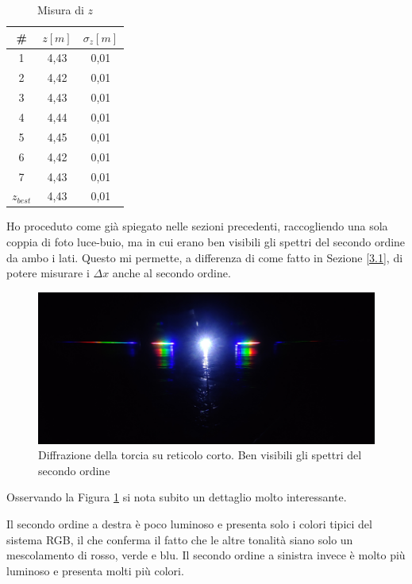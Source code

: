 \documentclass{article}
\begin{document}
\begin{table}[h]
    \centering
        \begin{tabular}{||c|c|c||}
            \hline
            \# & $z [m]$ & $\sigma_z [m]$\\
            \hline
            1 & 4,43 & 0,01 \\
            2 & 4,42 & 0,01 \\
            3 & 4,43 & 0,01 \\
            4 & 4,44 & 0,01 \\
            5 & 4,45 & 0,01 \\
            6 & 4,42 & 0,01 \\
            7 & 4,43 & 0,01 \\
            \hline
            $z_{best}$ & 4,43 & 0,01 \\
            \hline
        \end{tabular}
    \caption{Misura di $z$}
\end{table}


\vspace{3mm}

Ho proceduto come già spiegato nelle sezioni precedenti, raccogliendo una sola coppia di foto luce-buio, ma in cui erano ben visibili gli spettri del secondo ordine da ambo i lati. Questo mi permette, a differenza di come fatto in Sezione \ref{3.1}, di potere misurare i $\Delta x$ anche al secondo ordine.
\pagebreak
\begin{figure}[h]
    \centering
    \includegraphics[width=0.7\linewidth]{TorciaCorto5_OFF.jpg}
    \caption{Diffrazione della torcia su reticolo corto. Ben visibili gli spettri del secondo ordine}
    \label{TorciaCorto}
\end{figure}

Osservando la Figura \ref{TorciaCorto} si nota subito un dettaglio molto interessante. 

\vspace{3mm}

Il secondo ordine a destra è poco luminoso e presenta solo i colori tipici del sistema RGB, il che conferma il fatto che le altre tonalità siano solo un mescolamento di rosso, verde e blu. 
Il secondo ordine a sinistra invece è molto più luminoso e presenta molti più colori. 
\end{document}
